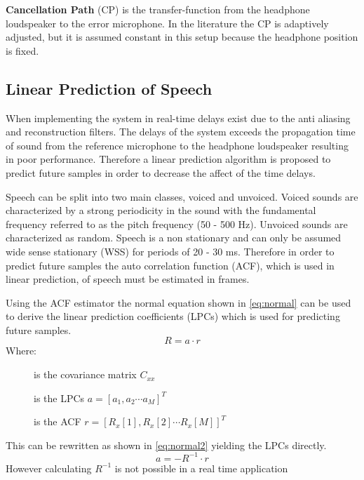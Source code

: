 \textbf{Cancellation Path} (CP) is the transfer-function from the headphone loudspeaker to the error microphone. In the literature \cite{Hansen} the CP is adaptively adjusted, but it is assumed constant in this setup because the headphone position is fixed.     

\subsection*{Linear Prediction of Speech}
When implementing the system in real-time delays exist due to the anti aliasing and reconstruction filters. The delays of the system exceeds the propagation time of sound from the reference microphone to the headphone loudspeaker resulting in poor performance. Therefore a linear prediction algorithm is proposed to predict future samples in order to decrease the affect of the time delays.


Speech can be split into two main classes, voiced and unvoiced. Voiced sounds are characterized by a strong periodicity in the sound with the fundamental frequency referred to as the pitch frequency (50 - 500 Hz). Unvoiced sounds are characterized as random. Speech is a non stationary and can only be assumed wide sense stationary (WSS) for periods of 20 - 30 ms. Therefore in order to predict future samples the auto correlation function (ACF), which is used in linear prediction, of speech must be estimated in frames. 


Using the ACF estimator the normal equation shown in \autoref{eq:normal} can be used to derive the linear prediction coefficients (LPCs) which is used for predicting future samples. 
\begin{equation}\label{eq:normal}
R = a\cdot r
\end{equation}
Where:
\vspace{-8mm} %
\begin{description}
	\item[] is the covariance matrix $C_{xx}$
	\item[] is the LPCs $a = [a_1 , a_2 \cdots a_M]^T$
	\item[] is the ACF $r = [R_x[1] , R_x[2] \cdots R_x[M]]^T$
\end{description}
This can be rewritten as shown in \autoref{eq:normal2} yielding the LPCs directly.  
 \begin{equation}\label{eq:normal2}
a = -R^{-1}\cdot r
\end{equation}
However calculating $R^{-1}$ is not possible in a real time application 




